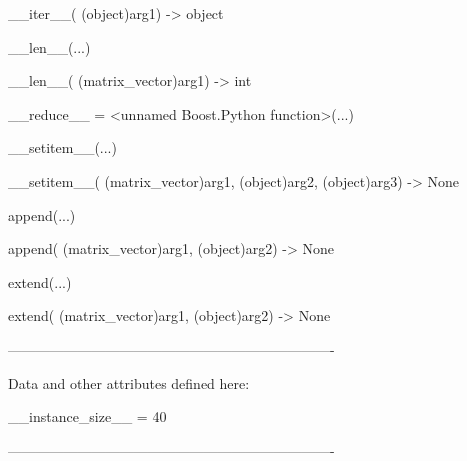 \documentclass[letterpaper,10pt,english]{sphinxmanual}
\begin{document}
\begin{description}
\begin{description}
\begin{DUlineblock}{0em}
\item[]
\begin{DUlineblock}{\DUlineblockindent}
\item[] \_\_iter\_\_( (object)arg1) -\textgreater{} object
\item[] 
\end{DUlineblock}
\item[] \_\_len\_\_(...)
\item[]
\begin{DUlineblock}{\DUlineblockindent}
\item[] \_\_len\_\_( (matrix\_vector)arg1) -\textgreater{} int
\item[] 
\end{DUlineblock}
\item[] \_\_reduce\_\_ = \textless{}unnamed Boost.Python function\textgreater{}(...)
\item[] 
\item[] \_\_setitem\_\_(...)
\item[]
\begin{DUlineblock}{\DUlineblockindent}
\item[] \_\_setitem\_\_( (matrix\_vector)arg1, (object)arg2, (object)arg3) -\textgreater{} None
\item[] 
\end{DUlineblock}
\item[] append(...)
\item[]
\begin{DUlineblock}{\DUlineblockindent}
\item[] append( (matrix\_vector)arg1, (object)arg2) -\textgreater{} None
\item[] 
\end{DUlineblock}
\item[] extend(...)
\item[]
\begin{DUlineblock}{\DUlineblockindent}
\item[] extend( (matrix\_vector)arg1, (object)arg2) -\textgreater{} None
\item[] 
\end{DUlineblock}
\item[] ----------------------------------------------------------------------
\item[] Data and other attributes defined here:
\item[] 
\item[] \_\_instance\_size\_\_ = 40
\item[] 
\item[] ----------------------------------------------------------------------

\end{DUlineblock}
\end{description}
\end{description}
\end{document}
